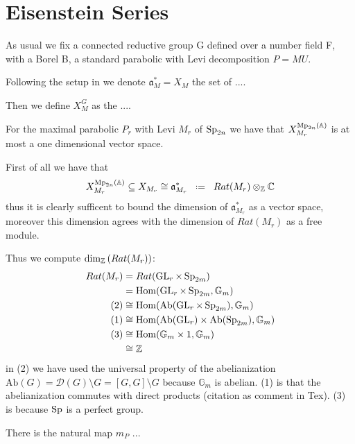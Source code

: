 \section{Eisenstein Series}
As usual we fix a connected reductive group G defined over a number field F, with a Borel B, a standard parabolic with Levi decomposition \(P = MU\). 

Following the setup in \cite[I.1.4]{moeglinSpectralDecompositionEisenstein1995} we denote \(\mathfrak{a}_M^* = X_M\) the set of ....\todo{}

Then we define \(X_M^G\) as the ....

\begin{example}
    For the maximal parabolic \(P_r\) with Levi \(M_r\) of \(\operatorname{Sp}_{2n}\) we have that \( X_{M_r}^{\Mp_{2n}(\A)}\) is at most a one dimensional \C vector space. 

    First of all we have that \cite[I.1.4]{moeglinSpectralDecompositionEisenstein1995}
         \[ X_{M_r}^{\Mp_{2n}(\A)} \subseteq X_{M_r} \cong \mathfrak{a}_{M_r}^*\defeq Rat(M_r) \tensor_\Z \C\]
        thus it is clearly sufficent to bound the dimension of \(\mathfrak{a}_{M_r}^*\) as a \C vector space, moreover this dimension agrees with the dimension of \(Rat(M_r)\) as a free \Z module. 

        Thus we compute \(\dim_\Z(Rat(M_r))\):
        \begin{equation*}
            \begin{aligned}
                Rat(M_r) &= Rat(\GL_r \times \Sp_{2m}) \\
                         &= \Hom(\GL_r \times \Sp_{2m}, \mathbb{G}_m) \\
                         (2)&\cong \Hom(\mathrm{Ab}(\GL_r \times \Sp_{2m}), \mathbb{G}_m) \\
                         (1)&\cong \Hom(\mathrm{Ab}(\GL_r) \times \mathrm{Ab}(\Sp_{2m}), \mathbb{G}_m) \\
                         (3)&\cong \Hom(\mathbb{G}_m \times 1, \mathbb{G}_m) \\
                         &\cong \Z
            \end{aligned}
        \end{equation*}
        in (2) we have used the universal property of the abelianization \(\mathrm{Ab}(G) = \mathcal{D}(G) \setminus G = [G, G] \setminus G \) because \(\mathbb{G}_m\) is abelian. (1) is that the abelianization commutes with direct products (citation as comment in Tex). (3) is because \(\operatorname{Sp}\) is a perfect group.
\end{example}
There is the natural map \(m_P\) ...\todo{}

